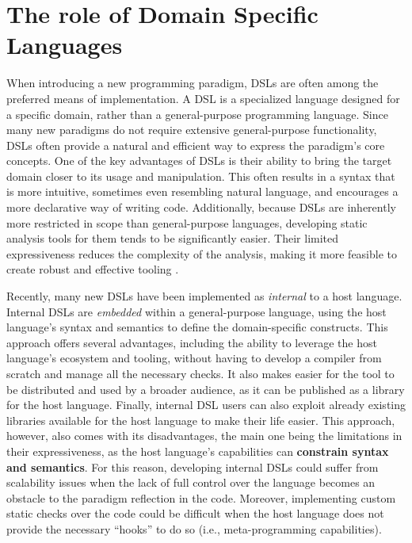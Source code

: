 \documentclass[12pt,a4paper,openright,twoside]{book}
\begin{document}
\section{The role of Domain Specific Languages} \label{sec:dsls}

When introducing a new programming paradigm, \acp{DSL} are often among the
preferred means of implementation. A \ac{DSL} is a specialized language designed
for a specific domain, rather than a general-purpose programming language. Since
many new paradigms do not require extensive general-purpose functionality,
\acp{DSL} often provide a natural and efficient way to express the paradigm’s
core concepts.
%
One of the key advantages of \acp{DSL} is their ability to bring the target
domain closer to its usage and manipulation. This often results in a syntax that
is more intuitive, sometimes even resembling natural language, and encourages a
more declarative way of writing code. Additionally, because \acp{DSL} are
inherently more restricted in scope than general-purpose languages, developing
static analysis tools for them tends to be significantly easier. Their limited
expressiveness reduces the complexity of the analysis, making it more feasible
to create robust and effective tooling \cite{DBLP:journals/csur/MernikHS05}. 

Recently, many new \acp{DSL} have been implemented as \emph{internal} to a host
language. Internal \acp{DSL} are \emph{embedded} within a general-purpose
language, using the host language's syntax and semantics to define the
domain-specific constructs. This approach offers several advantages, including
the ability to leverage the host language's ecosystem and tooling, without
having to develop a compiler from scratch and manage all the necessary checks.
It also makes easier for the tool to be distributed and used by a broader
audience, as it can be published as a library for the host language.
%
Finally, internal \ac{DSL} users can also exploit already existing libraries
available for the host language to make their life easier. This approach,
however, also comes with its disadvantages, the main one being the limitations
in their expressiveness, as the host language's capabilities can
\textbf{constrain syntax and semantics}. For this reason, developing internal
\acp{DSL} could suffer from scalability issues when the lack of full control
over the language becomes an obstacle to the paradigm reflection in the code.
Moreover, implementing custom static checks over the code could be difficult
when the host language does not provide the necessary ``hooks'' to do so (i.e.,
meta-programming capabilities).
\end{document}
